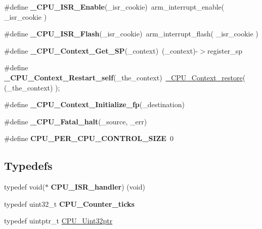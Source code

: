 \begin{DoxyCompactItemize}
\#define {\bfseries \+\_\+\+C\+P\+U\+\_\+\+I\+S\+R\+\_\+\+Enable}(\+\_\+isr\+\_\+cookie)~arm\+\_\+interrupt\+\_\+enable( \+\_\+isr\+\_\+cookie )
\item 
\mbox{\label{group__RTEMSScoreCPUARM_gac7e58e16c6b558daf31fe8f9dbec5a69}} 
\#define {\bfseries \+\_\+\+C\+P\+U\+\_\+\+I\+S\+R\+\_\+\+Flash}(\+\_\+isr\+\_\+cookie)~arm\+\_\+interrupt\+\_\+flash( \+\_\+isr\+\_\+cookie )
\item 
\mbox{\label{group__RTEMSScoreCPUARM_ga896055157b72692a6141f7c0039eabdf}} 
\#define {\bfseries \+\_\+\+C\+P\+U\+\_\+\+Context\+\_\+\+Get\+\_\+\+SP}(\+\_\+context)~(\+\_\+context)-\/$>$register\+\_\+sp
\item 
\mbox{\label{group__RTEMSScoreCPUARM_ga3fb67e174d7b61251322cd32126acd1a}} 
\#define {\bfseries \+\_\+\+C\+P\+U\+\_\+\+Context\+\_\+\+Restart\+\_\+self}(\+\_\+the\+\_\+context)~\mbox{\hyperlink{group__RTEMSScoreCPUARM_ga80726ebfe00f31a88b086cc4474c472f}{\+\_\+\+C\+P\+U\+\_\+\+Context\+\_\+restore}}( (\+\_\+the\+\_\+context) );
\item 
\#define {\bfseries \+\_\+\+C\+P\+U\+\_\+\+Context\+\_\+\+Initialize\+\_\+fp}(\+\_\+destination)
\item 
\#define {\bfseries \+\_\+\+C\+P\+U\+\_\+\+Fatal\+\_\+halt}(\+\_\+source,  \+\_\+err)
\item 
\mbox{\label{group__RTEMSScoreCPUARM_gaf8e38596ad3db49995fd8eb9fb4e86b2}} 
\#define {\bfseries C\+P\+U\+\_\+\+P\+E\+R\+\_\+\+C\+P\+U\+\_\+\+C\+O\+N\+T\+R\+O\+L\+\_\+\+S\+I\+ZE}~0
\end{DoxyCompactItemize}
\subsection*{Typedefs}
\begin{DoxyCompactItemize}
\item 
\mbox{\label{group__RTEMSScoreCPUARM_gac905d5415fa56674b259d97f4ea46e5c}} 
typedef void($\ast$ {\bfseries C\+P\+U\+\_\+\+I\+S\+R\+\_\+handler}) (void)
\item 
\mbox{\label{group__RTEMSScoreCPUARM_ga67f8550aad58bccb6fcb4589894444ad}} 
typedef uint32\+\_\+t {\bfseries C\+P\+U\+\_\+\+Counter\+\_\+ticks}
\item 
typedef uintptr\+\_\+t \mbox{\hyperlink{group__RTEMSScoreCPUARM_ga9fca17f81f850e128fcc8ed5b87ff2ab}{C\+P\+U\+\_\+\+Uint32ptr}}
\end{DoxyCompactItemize}
